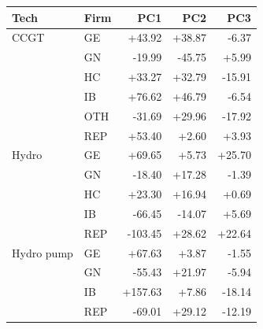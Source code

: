 \begin{tabular}{l l r r r}
\toprule
Tech & Firm & PC1 & PC2 & PC3 \\
\midrule
CCGT & GE & +43.92 & +38.87 & -6.37 \\
 & GN & -19.99 & -45.75 & +5.99 \\
 & HC & +33.27 & +32.79 & -15.91 \\
 & IB & +76.62 & +46.79 & -6.54 \\
 & OTH & -31.69 & +29.96 & -17.92 \\
 & REP & +53.40 & +2.60 & +3.93 \\
\addlinespace
Hydro & GE & +69.65 & +5.73 & +25.70 \\
 & GN & -18.40 & +17.28 & -1.39 \\
 & HC & +23.30 & +16.94 & +0.69 \\
 & IB & -66.45 & -14.07 & +5.69 \\
 & REP & -103.45 & +28.62 & +22.64 \\
\addlinespace
Hydro pump & GE & +67.63 & +3.87 & -1.55 \\
 & GN & -55.43 & +21.97 & -5.94 \\
 & IB & +157.63 & +7.86 & -18.14 \\
 & REP & -69.01 & +29.12 & -12.19 \\
\bottomrule
\end{tabular}